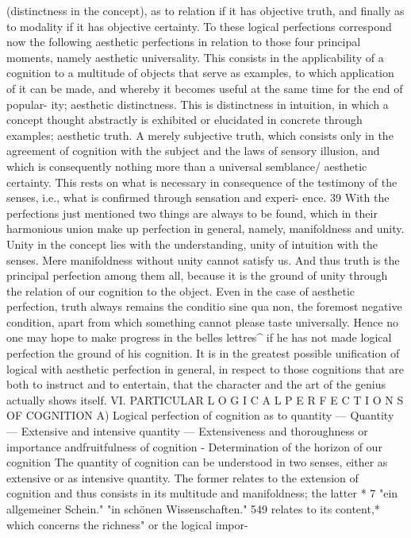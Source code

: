(distinctness in the concept), as to relation if it has objective truth, and
finally as to modality if it has objective certainty.
To these logical perfections correspond now the following aesthetic
perfections in relation to those four principal moments, namely
aesthetic universality. This consists in the applicability of a cognition to a
multitude of objects that serve as examples, to which application of it can be
made, and whereby it becomes useful at the same time for the end of popular-
ity;
aesthetic distinctness. This is distinctness in intuition, in which a concept
thought abstractly is exhibited or elucidated in concrete through examples;
aesthetic truth. A merely subjective truth, which consists only in the agreement
of cognition with the subject and the laws of sensory illusion, and which is
consequently nothing more than a universal semblance/
aesthetic certainty. This rests on what is necessary in consequence of the
testimony of the senses, i.e., what is confirmed through sensation and experi-
ence.
39
With the perfections just mentioned two things are always to be found,
which in their harmonious union make up perfection in general, namely,
manifoldness and unity. Unity in the concept lies with the understanding,
unity of intuition with the senses.
Mere manifoldness without unity cannot satisfy us. And thus truth is
the principal perfection among them all, because it is the ground of unity
through the relation of our cognition to the object. Even in the case of
aesthetic perfection, truth always remains the conditio sine qua non, the
foremost negative condition, apart from which something cannot please
taste universally. Hence no one may hope to make progress in the belles
lettres^ if he has not made logical perfection the ground of his cognition. It
is in the greatest possible unification of logical with aesthetic perfection in
general, in respect to those cognitions that are both to instruct and to
entertain, that the character and the art of the genius actually shows itself.
VI.
PARTICULAR L O G I C A L P E R F E C T I O N S OF
COGNITION
A) Logical perfection of cognition as to quantity — Quantity —
Extensive and intensive quantity — Extensiveness and thoroughness or
importance andfruitfulness of cognition - Determination of the
horizon of our cognition
The quantity of cognition can be understood in two senses, either as
extensive or as intensive quantity. The former relates to the extension of
cognition and thus consists in its multitude and manifoldness; the latter
*
7
"ein allgemeiner Schein."
"in schönen Wissenschaften."
549
relates to its content,* which concerns the richness" or the logical impor-
